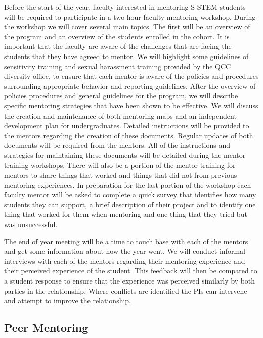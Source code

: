 \documentclass[12pt]{article}
\begin{document}
Before the start of the year, faculty interested in mentoring S-STEM students will be required to participate in a two hour faculty mentoring workshop.  During the workshop we will cover several main topics.  The first will be an overview of the program and an overview of the students enrolled in the cohort.  It is important that the faculty are aware of the challenges that are facing the students that they have agreed to mentor.  We will highlight some guidelines of sensitivity training and sexual harassment training provided by the  QCC diversity office, to ensure that each mentor is aware of the policies and procedures surrounding appropriate behavior and reporting guidelines.  After the overview of policies procedures and general guidelines for the program, we will describe specific mentoring strategies that have been shown to be effective. We will discuss the creation and maintenance of both mentoring maps and an independent development plan for undergraduates.  Detailed instructions will be provided to the mentors regarding the creation of these documents.  Regular updates of both documents will be required from the mentors.  All of the instructions and strategies for maintaining these documents will be detailed during the mentor training workshops.   There will also be a portion of the mentor training for mentors to share things that worked and things that did not from previous mentoring experiences.  In preparation for the last portion of the workshop each faculty mentor will be asked to complete a quick survey that identifies how many students they can support, a brief description of their project and to identify one thing that worked for them when mentoring and one thing that they tried but was unsuccessful. 

The end of year meeting will be a time to touch base with each of the mentors and get some information about how the year went.  We will conduct informal interviews with each of the mentors regarding their mentoring experience and their perceived experience of the student.  This feedback will then be compared to a student response to ensure that the experience was perceived similarly by both parties in the relationship.  Where conflicts are identified the PIs can intervene and attempt to improve the relationship.




\subsection{Peer Mentoring}
\end{document}
